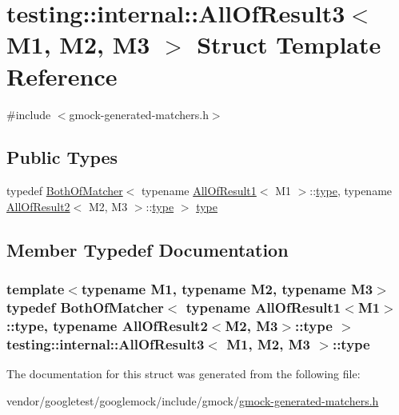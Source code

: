 \hypertarget{structtesting_1_1internal_1_1AllOfResult3}{}\section{testing\+:\+:internal\+:\+:All\+Of\+Result3$<$ M1, M2, M3 $>$ Struct Template Reference}
\label{structtesting_1_1internal_1_1AllOfResult3}


{\ttfamily \#include $<$gmock-\/generated-\/matchers.\+h$>$}

\subsection*{Public Types}
\begin{DoxyCompactItemize}
\item 
typedef \hyperlink{classtesting_1_1internal_1_1BothOfMatcher}{Both\+Of\+Matcher}$<$ typename \hyperlink{structtesting_1_1internal_1_1AllOfResult1}{All\+Of\+Result1}$<$ M1 $>$\+::\hyperlink{structtesting_1_1internal_1_1AllOfResult3_a18073a23acd542bccf3a6c5d7f72f957}{type}, typename \hyperlink{structtesting_1_1internal_1_1AllOfResult2}{All\+Of\+Result2}$<$ M2, M3 $>$\+::\hyperlink{structtesting_1_1internal_1_1AllOfResult3_a18073a23acd542bccf3a6c5d7f72f957}{type} $>$ \hyperlink{structtesting_1_1internal_1_1AllOfResult3_a18073a23acd542bccf3a6c5d7f72f957}{type}
\end{DoxyCompactItemize}


\subsection{Member Typedef Documentation}
\subsubsection[{\texorpdfstring{type}{type}}]{\setlength{\rightskip}{0pt plus 5cm}template$<$typename M1, typename M2, typename M3$>$ typedef {\bf Both\+Of\+Matcher}$<$ typename {\bf All\+Of\+Result1}$<$M1$>$\+::{\bf type}, typename {\bf All\+Of\+Result2}$<$M2, M3$>$\+::{\bf type} $>$ {\bf testing\+::internal\+::\+All\+Of\+Result3}$<$ M1, M2, M3 $>$\+::{\bf type}}\hypertarget{structtesting_1_1internal_1_1AllOfResult3_a18073a23acd542bccf3a6c5d7f72f957}{}\label{structtesting_1_1internal_1_1AllOfResult3_a18073a23acd542bccf3a6c5d7f72f957}


The documentation for this struct was generated from the following file\+:\begin{DoxyCompactItemize}
\item 
vendor/googletest/googlemock/include/gmock/\hyperlink{gmock-generated-matchers_8h}{gmock-\/generated-\/matchers.\+h}\end{DoxyCompactItemize}
